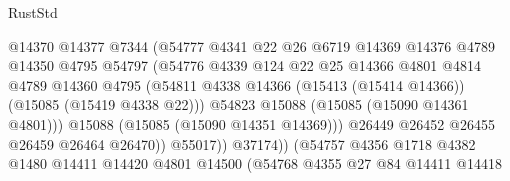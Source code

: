 \begin{lexlean}{RustStd}
\begin{coremodule}
                                      @14370
                                      @14377
                                      @7344
                                      (@54777
                                        @4341
                                        @22
                                        @26
                                        @6719
                                        @14369
                                        @14376
                                        @4789
                                        @14350
                                        @4795
                                        @54797
                                        (@54776
                                          @4339
                                          @124
                                          @22
                                          @25
                                          @14366
                                          @4801
                                          @4814
                                          @4789
                                          @14360
                                          @4795
                                          (@54811
                                            @4338
                                            @14366
                                            (@15413 (@15414 @14366))
                                            (@15085 (@15419 @4338 @22)))
                                          @54823
                                          @15088
                                          (@15085 (@15090 @14361 @4801)))
                                        @15088
                                        (@15085 (@15090 @14351 @14369)))
                                      @26449
                                      @26452
                                      @26455
                                      @26459
                                      @26464
                                      @26470))
                                  @55017))
                              @37174))
                          (@54757
                            @4356
                            @1718
                            @4382
                            @1480
                            @14411
                            @14420
                            @4801
                            @14500
                            (@54768
                              @4355
                              @27
                              @84
                              @14411
                              @14418

\end{coremodule}
\end{lexlean}
